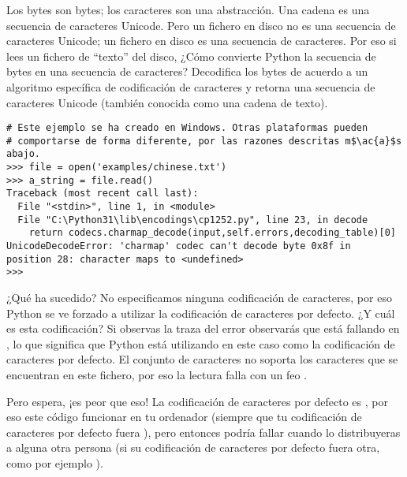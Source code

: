 Los bytes son bytes; los caracteres son una abstracción. Una cadena es una secuencia de caracteres Unicode. Pero un fichero en disco no es una secuencia de caracteres Unicode; un fichero en disco es una secuencia de caracteres. Por eso si lees un fichero de ``texto'' del disco, ¿Cómo convierte Python la secuencia de bytes en una secuencia de caracteres? Decodifica los bytes de acuerdo a un algoritmo específica de codificación de caracteres y retorna una secuencia de caracteres Unicode (también conocida como una cadena de texto).

\noindent\begin{minipage}{\textwidth}
\begin{lstlisting}[mathescape=True]
# Este ejemplo se ha creado en Windows. Otras plataformas pueden 
# comportarse de forma diferente, por las razones descritas m$\ac{a}$s abajo.
>>> file = open('examples/chinese.txt')
>>> a_string = file.read()
Traceback (most recent call last):
  File "<stdin>", line 1, in <module>
  File "C:\Python31\lib\encodings\cp1252.py", line 23, in decode
    return codecs.charmap_decode(input,self.errors,decoding_table)[0]
UnicodeDecodeError: 'charmap' codec can't decode byte 0x8f in 
position 28: character maps to <undefined>
>>> 
\end{lstlisting}
\end{minipage}

¿Qué ha sucedido? No especificamos ninguna codificación de caracteres, por eso Python se ve forzado a utilizar la codificación de caracteres por defecto. ¿Y cuál es esta codificación? Si observas la traza del error observarás que está fallando en , lo que significa que Python está utilizando en este caso  como la codificación de caracteres por defecto. El conjunto de caracteres  no soporta los caracteres que se encuentran en este fichero, por eso la lectura falla con un feo .


Pero espera, ¡es peor que eso! La codificación de caracteres por defecto es , por eso este código  funcionar en tu ordenador (siempre que tu codificación de caracteres por defecto fuera ), pero entonces podría fallar cuando lo distribuyeras a alguna otra persona (si su codificación de caracteres por defecto fuera otra, como por ejemplo ).

